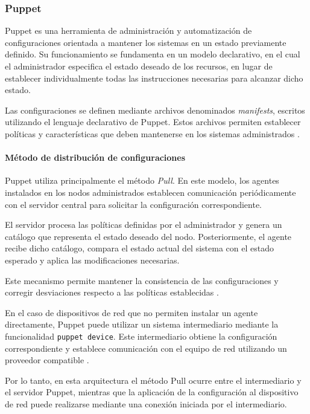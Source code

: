 \documentclass[12pt,a4paper]{article}
\begin{document}

\subsubsection{Puppet}
\label{sec:puppet}

Puppet es una herramienta de administración y automatización
de configuraciones orientada a mantener los sistemas en un
estado previamente definido. Su funcionamiento se fundamenta
en un modelo declarativo, en el cual el administrador especifica
el estado deseado de los recursos, en lugar de establecer
individualmente todas las instrucciones necesarias para alcanzar
dicho estado.

Las configuraciones se definen mediante archivos denominados
\textit{manifests}, escritos utilizando el lenguaje declarativo
de Puppet. Estos archivos permiten establecer políticas y
características que deben mantenerse en los sistemas
administrados \parencite{puppet_documentation}.


\paragraph{Método de distribución de configuraciones}

Puppet utiliza principalmente el método \textit{Pull}. En este
modelo, los agentes instalados en los nodos administrados
establecen comunicación periódicamente con el servidor central
para solicitar la configuración correspondiente.

El servidor procesa las políticas definidas por el administrador
y genera un catálogo que representa el estado deseado del nodo.
Posteriormente, el agente recibe dicho catálogo, compara el
estado actual del sistema con el estado esperado y aplica las
modificaciones necesarias.

Este mecanismo permite mantener la consistencia de las
configuraciones y corregir desviaciones respecto a las políticas
establecidas \parencite{puppet_documentation}.

En el caso de dispositivos de red que no permiten instalar
un agente directamente, Puppet puede utilizar un sistema
intermediario mediante la funcionalidad \texttt{puppet device}.
Este intermediario obtiene la configuración correspondiente
y establece comunicación con el equipo de red utilizando un
proveedor compatible \parencite{puppet_device}.

Por lo tanto, en esta arquitectura el método Pull ocurre
entre el intermediario y el servidor Puppet, mientras que
la aplicación de la configuración al dispositivo de red puede
realizarse mediante una conexión iniciada por el intermediario.
\end{document}
